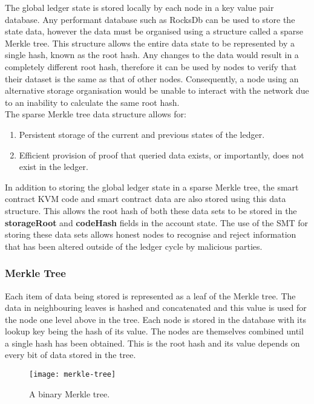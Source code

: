 
The global ledger state is stored locally by each node in a key value pair database. Any performant database such as RocksDb can be used to store the state data, however the data must be organised using a structure called a sparse Merkle tree. This structure allows the entire data state to be represented by a single hash, known as the root hash. Any changes to the data would result in a completely different root hash, therefore it can be used by nodes to verify that their dataset is the same as that of other nodes. Consequently, a node using an alternative storage organisation would be unable to interact with the network due to an inability to calculate the same root hash.\\

The sparse Merkle tree data structure allows for:

\begin{enumerate}
\item Persistent storage of the current and previous states of the ledger.
\item Efficient provision of proof that queried data exists, or importantly, does not exist in the ledger.\end{enumerate}

In addition to storing the global ledger state in a sparse Merkle tree, the smart contract KVM code and smart contract data are also stored using this data structure. This allows the root hash of both these data sets to be stored in the \textbf{storageRoot} and \textbf{codeHash} fields in the account state.  The use of the SMT for storing these data sets allows honest nodes to recognise and reject information that has been altered outside of the ledger cycle by malicious parties. \\

\subsubsection{Merkle Tree}

Each item of data being stored is represented as a leaf of the Merkle tree. The data in neighbouring leaves is hashed and concatenated and this value is used for the node one level above in the tree. Each node is stored in the database with its lookup key being the hash of its value. The nodes are themselves combined until a single hash has been obtained. This is the root hash and its value depends on every bit of data stored in the tree.\\

\begin{figure}[h]
  \centering
  \captionsetup{format=hang, font=footnotesize}
  \caption{A binary Merkle tree.}
\texttt{[image: merkle-tree]}
\end{figure}

